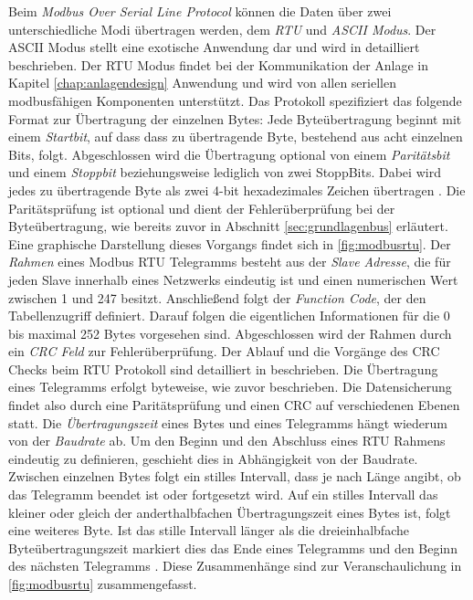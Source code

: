 Beim \textit{Modbus Over Serial Line Protocol} können die Daten über zwei unterschiedliche Modi übertragen werden, dem \textit{RTU} und \textit{ASCII Modus}. Der ASCII Modus stellt eine exotische Anwendung dar und wird in \cite{mod06ser} detailliert beschrieben.
Der RTU Modus findet bei der Kommunikation der Anlage in Kapitel \ref{chap:anlagendesign} Anwendung und wird von allen seriellen modbusfähigen Komponenten unterstützt.
Das Protokoll spezifiziert das folgende Format zur Übertragung der einzelnen Bytes: Jede Byteübertragung beginnt mit einem \textit{Startbit}, auf dass dass zu übertragende Byte, bestehend aus acht einzelnen Bits, folgt. Abgeschlossen wird die Übertragung optional von einem \textit{Paritätsbit} und einem \textit{Stoppbit} beziehungsweise lediglich von zwei StoppBits. Dabei wird jedes zu übertragende Byte als zwei 4-bit hexadezimales Zeichen übertragen \cite[S.~12f.]{mod06ser}. Die Paritätsprüfung ist optional und dient der Fehlerüberprüfung bei der Byteübertragung, wie bereits zuvor in Abschnitt \ref{sec:grundlagenbus} erläutert. Eine graphische Darstellung dieses Vorgangs findet sich in \ref{fig:modbusrtu}.
Der \textit{Rahmen} eines Modbus RTU Telegramms besteht aus der \textit{Slave Adresse}, die für jeden Slave innerhalb eines Netzwerks eindeutig ist und einen numerischen Wert zwischen 1 und 247 besitzt. Anschließend folgt der \textit{Function Code}, der den Tabellenzugriff definiert. Darauf folgen die eigentlichen Informationen für die 0 bis maximal 252 Bytes vorgesehen sind. Abgeschlossen wird der Rahmen durch ein \textit{CRC Feld} zur Fehlerüberprüfung. Der Ablauf und die Vorgänge des CRC Checks beim RTU Protokoll sind detailliert in \cite{mod06ser} beschrieben. Die Übertragung eines Telegramms erfolgt byteweise, wie zuvor beschrieben. Die Datensicherung findet also durch eine Paritätsprüfung und einen CRC auf verschiedenen Ebenen statt.
Die \textit{Übertragungszeit} eines Bytes und eines Telegramms hängt wiederum von der \textit{Baudrate} ab. Um den Beginn und den Abschluss eines RTU Rahmens eindeutig zu definieren, geschieht dies in Abhängigkeit von der Baudrate. Zwischen einzelnen Bytes folgt ein stilles Intervall, dass je nach Länge angibt, ob das Telegramm beendet ist oder fortgesetzt wird. Auf ein stilles Intervall das kleiner oder gleich der anderthalbfachen Übertragungszeit eines Bytes ist, folgt eine weiteres Byte. Ist das stille Intervall länger als die dreieinhalbfache Byteübertragungszeit markiert dies das Ende eines Telegramms und den Beginn des nächsten Telegramms \cite[S.~13]{mod06ser}. Diese Zusammenhänge sind zur Veranschaulichung in \ref{fig:modbusrtu} zusammengefasst.

